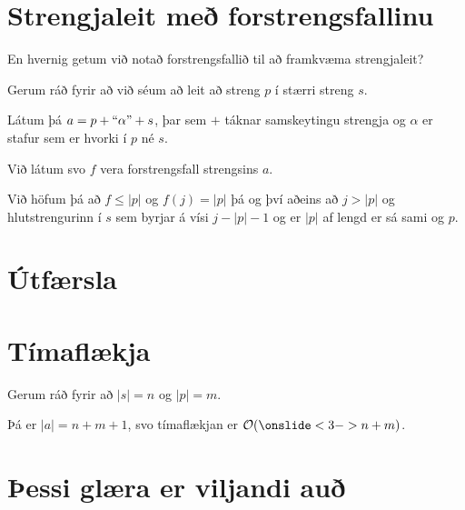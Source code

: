 \section{Strengjaleit með forstrengsfallinu}
{
    {
        \item<1-> En hvernig getum við notað forstrengsfallið til að framkvæma strengjaleit?
        \item<2-> Gerum ráð fyrir að við séum að leit að streng $p$ í stærri streng $s$.
        \item<3-> Látum þá $a = p + ``\alpha" + s$, þar sem $+$ táknar samskeytingu strengja og $\alpha$ er stafur sem er hvorki í $p$ né $s$.
        \item<4-> Við látum svo $f$ vera forstrengsfall strengsins $a$.
        \item<5-> Við höfum þá að $f \leq |p|$ og $f(j) = |p|$ þá og því aðeins að $j > |p|$ og hlutstrengurinn í $s$ sem byrjar á vísi $j - |p| - 1$
                    og er $|p|$ af lengd er sá sami og $p$.
    }
}

\section{Útfærsla}
{
}

\section{Tímaflækja}
{
    {
        \item<1-> Gerum ráð fyrir að $|s| = n$ og $|p| = m$.
        \item<2-> Þá er $|a| = n + m + 1$, svo tímaflækjan er $\mathcal{O}(\onslide<3->{n + m})$.
    }
}

\section{Þessi glæra er viljandi auð}
{
}


